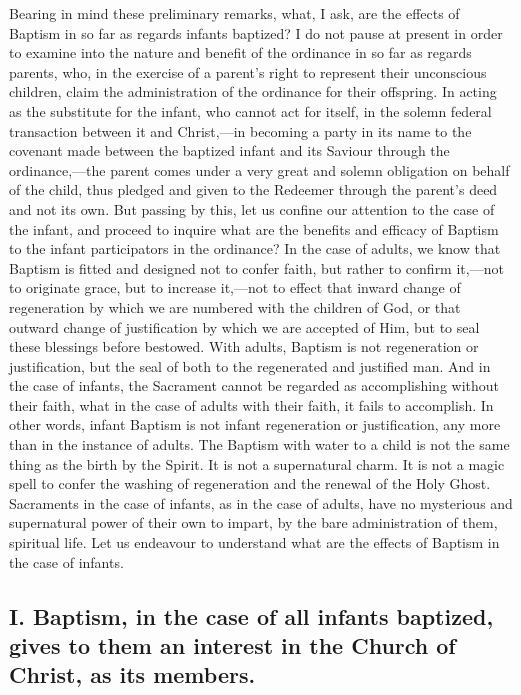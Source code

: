 \documentclass[]{book}
\begin{document}
Bearing in mind these preliminary remarks, what, I ask, are the effects of Baptism in so far as regards infants baptized? I do not pause at present in order to examine into the nature and benefit of the ordinance in so far as regards parents, who, in the exercise of a parent's right to represent their unconscious children, claim the administration of the ordinance for their offspring. In acting as the substitute for the infant, who cannot act for itself, in the solemn federal transaction between it and Christ,---in becoming a party in its name to the covenant made between the baptized infant and its Saviour through the ordinance,---the parent comes under a very great and solemn obligation on behalf of the child, thus pledged and given to the Redeemer through the parent's deed and not its own. But passing by this, let us confine our attention to the case of the infant, and proceed to inquire what are the benefits and efficacy of Baptism to the infant participators in the ordinance? In the case of adults, we know that Baptism is fitted and designed not to confer faith, but rather to confirm it,---not to originate grace, but to increase it,---not to effect that inward change of regeneration by which we are numbered with the children of God, or that outward change of justification by which we are accepted of Him, but to seal these blessings before bestowed. With adults, Baptism is not regeneration or justification, but the seal of both to the regenerated and justified man. And in the case of infants, the Sacrament cannot be regarded as accomplishing without their faith, what in the case of adults with their faith, it fails to accomplish. In other words, infant Baptism is not infant regeneration or justification, any more than in the instance of adults. The Baptism with water to a child is not the same thing as the birth by the Spirit. It is not a supernatural charm. It is not a magic spell to confer the washing of regeneration and the renewal of the Holy Ghost. Sacraments in the case of infants, as in the case of adults, have no mysterious and supernatural power of their own to impart, by the bare administration of them, spiritual life. Let us endeavour to understand what are the effects of Baptism in the case of infants.

\hypertarget{i.-baptism-in-the-case-of-all-infants-baptized-gives-to-them-an-interest-in-the-church-of-christ-as-its-members.}{%
\subsection{I. Baptism, in the case of all infants baptized, gives to them an interest in the Church of Christ, as its members.}\label{i.-baptism-in-the-case-of-all-infants-baptized-gives-to-them-an-interest-in-the-church-of-christ-as-its-members.}}
\end{document}
